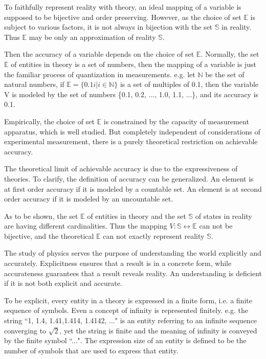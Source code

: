 \documentclass{amsart}
\theoremstyle{definition}
\theoremstyle{remark}
\numberwithin{equation}{section}
\begin{document}
To faithfully represent reality with theory, an ideal mapping of a variable is supposed to be bijective and order preserving. However, as the choice of set $\mathbb{E}$ is subject to various factors, it is not always in bijection with the set $\mathbb{S}$ in reality. Thus $\mathbb{E}$ may be only an approximation of reality $\mathbb{S}$.

Then the accuracy of a variable depends on the choice of set $\mathbb{E}$. Normally, the set $\mathbb{E}$ of entities in theory is a set of numbers, then the mapping of a variable is just the familiar process of quantization in measurements. e.g. let $\mathbb{N}$ be the set of natural numbers, if $\mathbb{E}=\{0.1i|i\in\mathbb{N}\}$ is a set of multiples of 0.1, then the variable V is modeled by the set of numbers \{0.1, 0.2, ..., 1.0, 1.1, ...\}, and its accuracy is 0.1.

Empirically, the choice of set $\mathbb{E}$ is constrained by the capacity of measurement apparatus, which is well studied. But completely independent of considerations of experimental measurement, there is a purely theoretical restriction on achievable accuracy.

The theoretical limit of achievable accuracy is due to the expressiveness of theories. To clarify, the definition of accuracy can be generalized. An element is at first order accuracy if it is modeled by a countable set. An element is at second order accuracy if it is modeled by an uncountable set.

As to be shown, the set $\mathbb{E}$ of entities in theory and the set $\mathbb{S}$ of states in reality are having different cardinalities. Thus the mapping $V: \mathbb{S}\leftrightarrow \mathbb{E}$ can not be bijective, and the theoretical $\mathbb{E}$ can not exactly represent reality $\mathbb{S}$.

The study of physics serves the purpose of understanding the world explicitly and accurately. Explicitness ensures that a result is in a concrete form, while accurateness guarantees that a result reveals reality. An understanding is deficient if it is not both explicit and accurate.

To be explicit, every entity in a theory is expressed in a finite form, i.e. a finite sequence of symbols. Even a concept of infinity is represented finitely. e.g. the string ``1, 1.4, 1.41,1.414, 1.4142, ..." is an entity referring to an infinite sequence converging to $\sqrt 2$, yet the string is finite and the meaning of infinity is conveyed by the finite symbol ``...". The expression size of an entity is defined to be the number of symbols that are used to express that entity.
\end{document}
